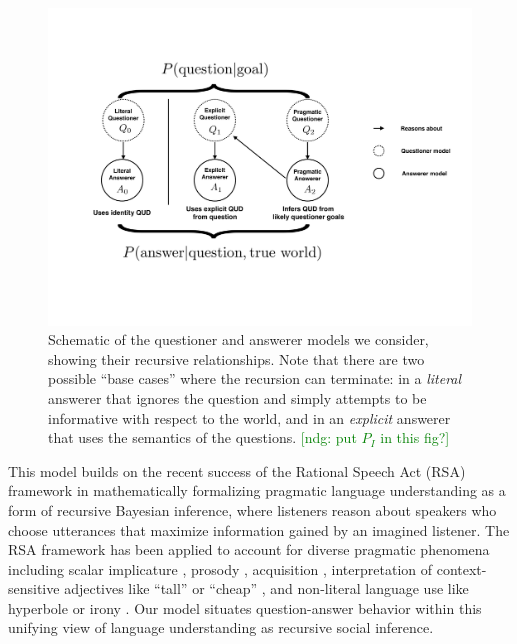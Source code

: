 \documentclass[12pt, floatsintext, jou]{apa6}
\newcommand{\ndg}[1]{\textcolor{Green}{[ndg: #1]}}
\begin{document}
\begin{figure}[t]
\begin{center}
\includegraphics[scale = .5]{models.pdf}
\end{center}
\caption{Schematic of the questioner and answerer models we consider, showing their recursive relationships. Note that there are two possible ``base cases'' where the recursion can terminate: in a \emph{literal} answerer that ignores the question and simply attempts to be informative with respect to the world, and in an \emph{explicit} answerer that uses the semantics of the questions. \ndg{put $P_I$ in this fig?}}
\label{fig:models}
\end{figure}

This model builds on the recent success of the Rational Speech Act (RSA) framework \cite{FrankGoodman12_PragmaticReasoningLanguageGames, GoodmanStuhlmuller13_KnowledgeImplicature, GoodmanFrank16_RSATiCS} in mathematically formalizing pragmatic language understanding as a form of recursive Bayesian inference, where listeners reason about speakers who choose utterances that maximize information gained by an imagined listener. The RSA framework has been applied to account for diverse pragmatic phenomena including scalar implicature \cite{GoodmanStuhlmuller13_KnowledgeImplicature}, prosody \cite{BergenGoodman15_StrategicUseOfNoise},
acquisition \cite{FrankGoodman14_InferringWordMeanings}, 
interpretation of context-sensitive adjectives like ``tall'' or ``cheap'' \cite{LassiterGoodman15_AdjectivalVagueness}, and
non-literal language use like hyperbole \cite{KaoWuBergenGoodman14_NonliteralNumberWords} or irony \cite{KaoGoodman15_IronyCogSci}.
Our model situates question-answer behavior within this unifying view of language understanding as recursive social inference. 
\end{document}
